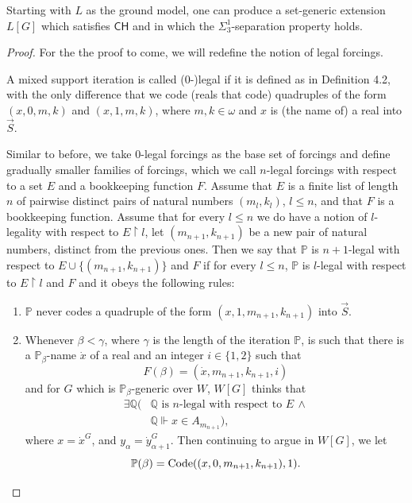 \documentclass[10pt,a4paper]{amsart}
\newcommand{\CH}{\mathsf{CH}}
\newcommand{\forceP}{\mathbb{P}}
\newcommand{\forceQ}{\mathbb{Q}}
\begin{document}
\begin{theorem}
Starting with $L$ as the ground model, one can produce a set-generic extension $L[G]$ which satisfies $\CH$ and in which the ${\Sigma^1_3}$-separation property holds.
\end{theorem}

\begin{proof}


For the the proof to come, we will redefine the notion of legal forcings.
\begin{definition}
A mixed support iteration is called (0-)legal if it is defined as in Definition 4.2, with the only difference that we code (reals that code) quadruples of the form $(x,0,m,k)$ and $(x,1,m,k)$, where $m,k \in \omega$ and $x$ is (the name of) a real into $\vec{S}$.
\end{definition}
Similar to before, we take 0-legal forcings as the base set of forcings and define gradually smaller families of forcings, which we call $n$-legal forcings with respect to a set $E$ and a bookkeeping function $F$.
Assume that $E$ is a finite list of length $n$ of pairwise distinct pairs of natural numbers $(m_l, k_l)$, $l \le n$,
and that $F$ is a bookkeeping function.
Assume that for every $l \le n$ we do have a notion of $l$-legality with respect to $E \upharpoonright l$, let $(m_{n+1}, k_{n+1})$ be a new pair of natural numbers, distinct from the previous ones. Then we say that $\forceP$ is $n+1$-legal with respect to $E \cup \{ (m_{n+1}, k_{n+1} ) \}$ and $F$ if for every $l \le n$, $\forceP $ is $l$-legal with respect to $E \upharpoonright l$ and $F$ and it obeys the following rules:
\begin{enumerate}
\item $\forceP$ never codes a quadruple of the form $(x,1,m_{n+1},k_{n+1})$ into $\vec{S}$.
\item Whenever $\beta < \gamma $, where $\gamma$ is the length of the iteration $\forceP$, is such that there is a $\forceP_{\beta}$-name $\dot{x}$ of a real and an integer $ i\in\{1,2\}$ such that
\[F(\beta)= (\dot{x},m_{n+1},k_{n+1},i)\] and for  $G$ which is $\forceP_{\beta}$-generic over $W$, $W[G]$ thinks that
\begin{align*}
\exists \forceQ (&\forceQ \text{ is } n \text{-legal with respect to } E \,  \land \\&   \forceQ \Vdash x \in A_{m_{n+1}}),
\end{align*}
where $x=\dot{x}^G$, and $y_{\alpha}=\dot{y}_{\alpha+1}^G$.
Then continuing to argue in $W[G]$, we let
\[\forceP(\beta)= \hbox{Code}((x,0,m_{n+1},k_{n+1}),1).\] 


\end{enumerate}
\end{proof}
\end{document}
